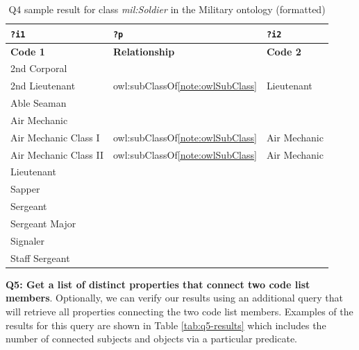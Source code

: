 \begin{table}[ht]
\footnotesize
\centering
\begin{tabular}{|l|l|l|}
\hline
\textbf{\texttt{?i1}}       & \textbf{\texttt{?p}}                     & \textbf{\texttt{?i2}}       \\ \hline \hline
\textbf{Code 1}             & \textbf{Relationship}                    & \textbf{Code 2}             \\ \hline
2nd Corporal                &                                          &                             \\ \hline
2nd Lieutenant              & owl:subClassOf\cref{note:owlSubClass}    & Lieutenant                  \\ \hline
Able Seaman                 &                                          &                             \\ \hline
Air Mechanic                &                                          &                             \\ \hline
Air Mechanic Class I        & owl:subClassOf\cref{note:owlSubClass}    & Air Mechanic                \\ \hline
Air Mechanic Class II       & owl:subClassOf\cref{note:owlSubClass}    & Air Mechanic                \\ \hline
Lieutenant                  &                                          &                             \\ \hline
Sapper                      &                                          &                             \\ \hline
Sergeant                    &                                          &                             \\ \hline
Sergeant Major              &                                          &                             \\ \hline
Signaler                    &                                          &                             \\ \hline
Staff Sergeant              &                                          &                             \\ \hline
\end{tabular}
\caption{Q4 sample result for class \textit{mil:Soldier} in the Military ontology (formatted)} \label{tab:q4-results}
\end{table}

\medskip
\noindent\textbf{Q5: Get a list of distinct properties that connect two code list members}. Optionally, we can verify our results using an additional query that will retrieve all properties connecting the two code list members. Examples of the results for this query are shown in Table \ref{tab:q5-results} which includes the number of connected subjects and objects via a particular predicate.

